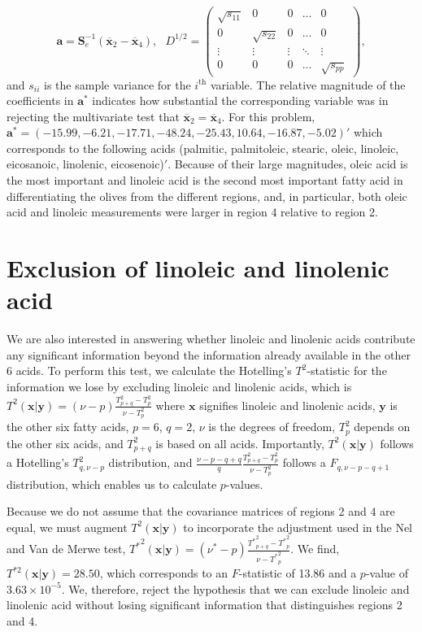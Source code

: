 \documentclass[11pt]{article}
\newcommand{\m}[1]{\mathbf{\bm{#1}}}
\begin{document}
\[ \m{a}= \m{S}_e^{-1} (\overline{\m{x}}_2-\overline{\m{x}}_4),~~~
D^{1/2}= \begin{pmatrix}
\sqrt{s_{11}} &0&0&...&0 \\
0&\sqrt{s_{22}}&0&...&0 \\
\vdots&\vdots&\vdots&\ddots&\vdots\\
0&0&0&...&\sqrt{s_{pp}}
\end{pmatrix}, \] and $s_{ii}$ is the sample variance for the $i^{\textrm{th}}$ variable.  The relative magnitude of the coefficients in $\m{a}^*$ indicates how substantial the corresponding variable was in rejecting the multivariate test that $\overline{\m{x}}_2=\overline{\m{x}}_4$.  For this problem, $\m{a^*}=(-15.99,  -6.21, -17.71, -48.24, -25.43, 10.64, -16.87,  -5.02)'$ which corresponds to the following acids (palmitic, palmitoleic, stearic, oleic, linoleic, eicosanoic, linolenic, eicosenoic)$'$.  Because of their large magnitudes, oleic acid is the most important and linoleic acid is the second most important fatty acid in differentiating the olives from the different regions, and, in particular, both oleic acid and linoleic measurements were larger in region 4 relative to region 2. 
\vspace{-4mm}

\section*{Exclusion of linoleic and linolenic acid}
\vspace{-4mm}
We are also interested in answering whether linoleic and linolenic acids contribute any significant information beyond the information already available in the other 6 acids.  To perform this test, we calculate the Hotelling's $T^2$-statistic for the information we lose by excluding linoleic and linolenic acids, which is $T^2(\m{x} | \m{y}) =  (\nu - p) \frac{T^2_{p+q}-T^2_p}{\nu - T^2_p}$ where $\m{x}$ signifies linoleic and linolenic acids, $\m{y}$ is the other six fatty acids, $p=6$, $q=2$, $\nu$ is the degrees of freedom, $T^2_p$ depends on the other six acids, and $T^2_{p+q}$ is based on all acids.  Importantly, $T^2(\m{x} | \m{y})$ follows a Hotelling's $T^2_{q,\nu-p}$ distribution, and $\frac{\nu-p-q+q}{q} \frac{T^2_{p+q}-T^2_p}{\nu - T^2_p}$ follows a $F_{q,\nu-p-q+1}$ distribution, which enables us to calculate $p$-values. 

Because we do not assume that the covariance matrices of regions 2 and 4 are equal, we must augment $T^2(\m{x} | \m{y})$ to incorporate the adjustment used in the Nel and Van de Merwe test, ${T^*}^2(\m{x} | \m{y})=(\nu^* - p) \frac{{T^*}^2_{p+q}-{T^*}^2_p}{\nu - {T^*}^2_p}$.  We find, $T^{*2}(\m{x} | \m{y})=28.50$, which corresponds to an $F$-statistic of 13.86 and a $p$-value of $3.63\times10^{-5}$. We, therefore, reject the hypothesis that we can exclude linoleic and linolenic acid without losing significant information that distinguishes regions 2 and 4.
\vspace{-4mm}
\end{document}
